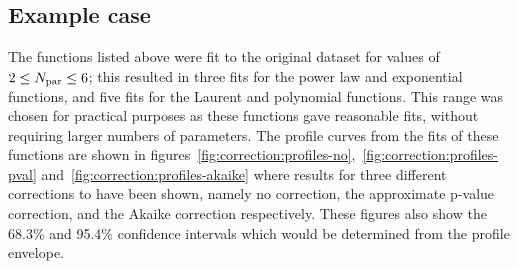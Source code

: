 \subsection{Example case}
\label{sec:correction:example}

The functions listed above were fit to the original dataset for values of
$2 \le N_{\rm par} \le 6$; this resulted in three fits for the power law and
exponential functions, and five fits for the Laurent and polynomial functions.
This range was chosen for practical purposes as these functions gave reasonable
fits, without requiring larger numbers of parameters.
The profile curves from the fits of these functions are shown in
figures~\ref{fig:correction:profiles-no},~\ref{fig:correction:profiles-pval} and~\ref{fig:correction:profiles-akaike} where results for three different
corrections to \nll have been shown, namely no correction, the approximate
p-value correction, and the Akaike correction respectively.
These figures also show the 68.3\% and
95.4\% confidence intervals which would be determined from the
profile envelope. 

